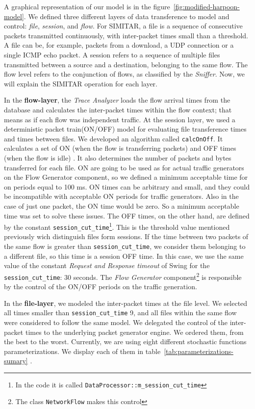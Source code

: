 A graphical representation of our model is in the  figure~\ref{fig:modified-harpoon-model}. We defined three different layers of data transference to model and control: \textit{file}, \textit{session}, and \textit{flow}. For SIMITAR, a file is a sequence of consecutive packets transmitted continuously, with inter-packet times small than a threshold. A file can be, for example, packets from a download, a UDP connection or a single \acrshort{ICMP} echo packet. A session refers to a sequence of multiple files transmitted between a source and a destination, belonging to the same flow. The flow level refers to the conjunction of flows, as classified by the \textit{Sniffer}. Now, we will explain the SIMITAR operation for each layer.

In the \textbf{flow-layer}, the \textit{Trace Analyzer}  loads the flow arrival times from the database and calculates the inter-packet times within the flow context; that means as if each flow was independent traffic. At the session layer, we used a deterministic packet train(ON/OFF) model for evaluating file transference times and times between files. We developed an algorithm called \texttt{calcOnOff}. It calculates a set of ON (when the flow is transferring packets) and OFF times (when the flow is idle) . It also determines the number of packets and bytes transferred for each file. ON are going to be used as for actual traffic generators on the Flow Generator component, so we defined a minimum acceptable time for on periods equal to 100 ms. ON times can be arbitrary and small, and they could be incompatible with acceptable ON periods for traffic generators. Also in the case of just one packet, the ON time would be zero. So a minimum acceptable time was set to solve these issues. The OFF times, on the other hand, are defined by the constant \texttt{session\_cut\_time}\footnote{In the code it is called \texttt{DataProcessor::m\_session\_cut\_time} }. This is the threshold value mentioned previously wich distinguish files form sessions. If the time between two packets of the same flow is greater than \texttt{session\_cut\_time}, we consider them belonging to a different file, so this time is a session OFF time. In this case, we use the same value of the constant \textit{Request and Response timeout} of Swing\cite{swing-paper} for the \texttt{session\_cut\_time}: 30 seconds. The \textit{Flow Generator} component\footnote{ The class \texttt{NetworkFlow} makes this control} is responsible by the control of the ON/OFF periods on the traffic generation.

In the \textbf{file-layer}, we modeled the inter-packet times at the file level. We selected all times smaller than \texttt{session\_cut\_time} 9, and all files within the same flow were considered to follow the same model. We delegated the control of the inter-packet times to the underlying packet generator engine. We ordered them, from the best to the worst. Currently, we are using eight different stochastic functions parameterizations. We display each of them in table~\ref{tab:parameterizations-sumary} .

